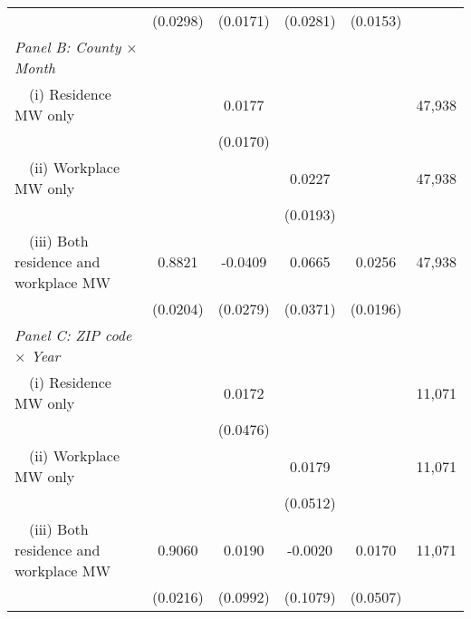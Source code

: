 \begin{landscape}
\begin{table}[ht!]
\begin{tabular}{@{}lccccc@{}}
                                                             & (0.0298) & (0.0171) & (0.0281) & (0.0153) &      \\
        \textit{Panel B: County $\times$ Month}              &       &       &       &       &      \\
        $\quad$(i) Residence MW only                         &       &  0.0177  &       &       & 47,938 \\
                                                             &       & (0.0170) &       &       &      \\
        $\quad$(ii) Workplace MW only                        &       &       &  0.0227  &       & 47,938 \\
                                                             &       &       & (0.0193) &       &      \\
        $\quad$(iii) Both residence and workplace MW         &  0.8821  &  -0.0409  &  0.0665  &  0.0256  & 47,938 \\
                                                             & (0.0204) & (0.0279) & (0.0371) & (0.0196) &      \\
        \textit{Panel C: ZIP code $\times$ Year}             &       &       &       &       &      \\
        $\quad$(i) Residence MW only                         &       &  0.0172  &       &       & 11,071 \\
                                                             &       & (0.0476) &       &       &      \\
        $\quad$(ii) Workplace MW only                        &       &       &  0.0179  &       & 11,071 \\
                                                             &       &       & (0.0512) &       &      \\
        $\quad$(iii) Both residence and workplace MW         &  0.9060  &  0.0190  &  -0.0020  &  0.0170  & 11,071 \\
                                                             & (0.0216) & (0.0992) & (0.1079) & (0.0507) &      \\ \bottomrule
    \end{tabular}
    

\end{table}
\end{landscape}
